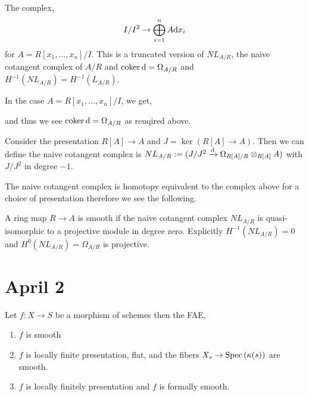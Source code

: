 \documentclass[12pt]{article}
\begin{document}
\begin{rmk}
The complex,
\[ I/I^2 \to \bigoplus^n_{i = 1} A \mathrm{d}{x_i} \]
for $A = R[x_1, \dots, x_n]/I$. This is a truncated version of $NL_{A/R}$, the naive cotangent complex of $A/R$ and $\operatorname{\mathrm{coker}}{\mathrm{d}} = \Omega_{A/R}$ and $H^{-1}(NL_{A/R}) = H^{-1}(L_{A/R})$. 
\end{rmk}

\begin{rmk}
In the case $A = R[x_1, \dots, x_n]/I$, we get,
\begin{center}
\end{center}
and thus we see $\operatorname{\mathrm{coker}}{\mathrm{d}} = \Omega_{A/R}$ as reuqired above.
\end{rmk}

\begin{defn}
Consider the presentation $R[A] \to A$ and $J = \ker{(R[A] \to A)}$. Then we can define the naive cotangent complex is $NL_{A/R} := (J/J^2 \xrightarrow{\mathrm{d}} \Omega_{R[A]/R} \otimes_{R[A]} A)$ with $J/J^2$ in degree $-1$.
\end{defn}

\begin{rmk}
The naive cotangent complex is homotopy equivalent to the complex above for a choice of presentation therefore we see the following.
\end{rmk}

\begin{prop}
A ring map $R \to A$ is smooth if the naive cotangent complex $NL_{A/R}$ is quasi-isomorphic to a projective module in degree zero. Explicitly $H^{-1}(NL_{A/R}) = 0$ and $H^0(NL_{A/R}) = \Omega_{A/R}$ is projective.
\end{prop}

\section{April 2}

\begin{theorem}
Let $f : X \to S$ be a morphism of schemes then the FAE,
\begin{enumerate}
\item $f$ is smooth
\item $f$ is locally finite presentation, flat, and the fibers $X_s \to \mathrm{Spec}\left( \kappa(s) \right)$ are smooth.
\item $f$ is locally finitely presentation and $f$ is formally smooth. 
\end{enumerate}
\end{theorem}
\end{document}
